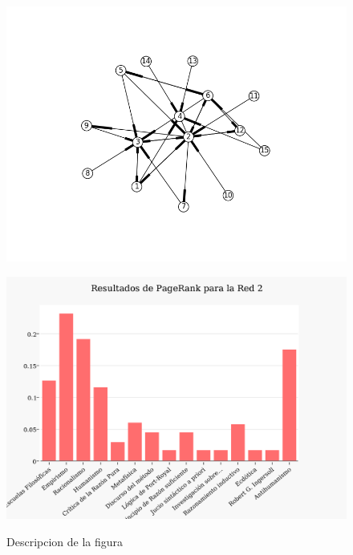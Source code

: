 \documentclass[a4paper]{article}
\begin{document}
\begin{figure}[h!]
  \begin{center}
	\includegraphics[scale=0.60]{imagenes/Exp3/grafobefore}
	\caption{}
	\label{gbefore3}
  \end{center}
\end{figure}
\newpage
\begin{figure}[h!]
  \begin{center}
	\includegraphics[scale=0.80]{imagenes/Exp3/before}
	\label{before3}
	\caption{Descripcion de la figura}
  \end{center}
\end{figure}
\end{document}
